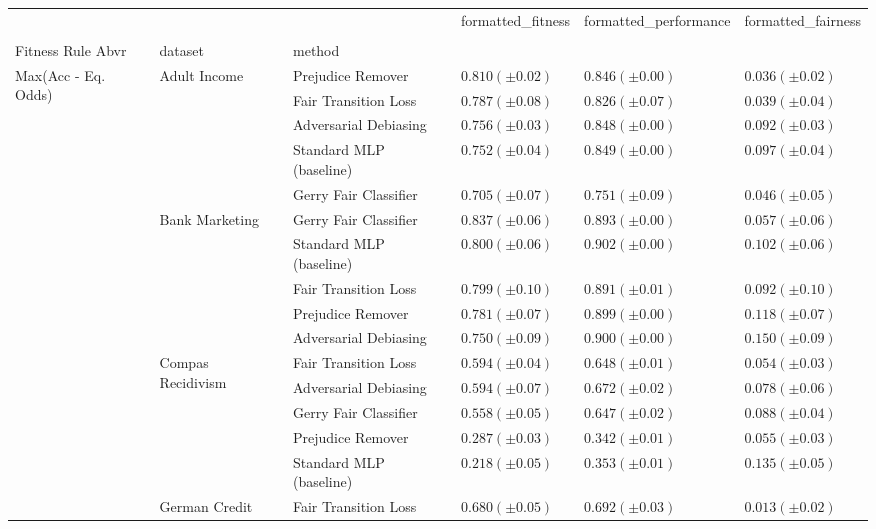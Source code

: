 \begin{tabular}{llllll}
\toprule
 &  &  & formatted_fitness & formatted_performance & formatted_fairness \\
 &  &  &  &  &  \\
Fitness Rule Abvr & dataset & method &  &  &  \\
\midrule
\multirow[t]{20}{*}{Max(Acc - Eq. Odds)} & \multirow[t]{5}{*}{Adult Income} & Prejudice Remover & $0.810 (\pm0.02)$ & $0.846 (\pm0.00)$ & $0.036 (\pm0.02)$ \\
 &  & Fair Transition Loss & $0.787 (\pm0.08)$ & $0.826 (\pm0.07)$ & $0.039 (\pm0.04)$ \\
 &  & Adversarial Debiasing & $0.756 (\pm0.03)$ & $0.848 (\pm0.00)$ & $0.092 (\pm0.03)$ \\
 &  & Standard MLP (baseline) & $0.752 (\pm0.04)$ & $0.849 (\pm0.00)$ & $0.097 (\pm0.04)$ \\
 &  & Gerry Fair Classifier & $0.705 (\pm0.07)$ & $0.751 (\pm0.09)$ & $0.046 (\pm0.05)$ \\
\cline{2-6}
 & \multirow[t]{5}{*}{Bank Marketing} & Gerry Fair Classifier & $0.837 (\pm0.06)$ & $0.893 (\pm0.00)$ & $0.057 (\pm0.06)$ \\
 &  & Standard MLP (baseline) & $0.800 (\pm0.06)$ & $0.902 (\pm0.00)$ & $0.102 (\pm0.06)$ \\
 &  & Fair Transition Loss & $0.799 (\pm0.10)$ & $0.891 (\pm0.01)$ & $0.092 (\pm0.10)$ \\
 &  & Prejudice Remover & $0.781 (\pm0.07)$ & $0.899 (\pm0.00)$ & $0.118 (\pm0.07)$ \\
 &  & Adversarial Debiasing & $0.750 (\pm0.09)$ & $0.900 (\pm0.00)$ & $0.150 (\pm0.09)$ \\
\cline{2-6}
 & \multirow[t]{5}{*}{Compas Recidivism} & Fair Transition Loss & $0.594 (\pm0.04)$ & $0.648 (\pm0.01)$ & $0.054 (\pm0.03)$ \\
 &  & Adversarial Debiasing & $0.594 (\pm0.07)$ & $0.672 (\pm0.02)$ & $0.078 (\pm0.06)$ \\
 &  & Gerry Fair Classifier & $0.558 (\pm0.05)$ & $0.647 (\pm0.02)$ & $0.088 (\pm0.04)$ \\
 &  & Prejudice Remover & $0.287 (\pm0.03)$ & $0.342 (\pm0.01)$ & $0.055 (\pm0.03)$ \\
 &  & Standard MLP (baseline) & $0.218 (\pm0.05)$ & $0.353 (\pm0.01)$ & $0.135 (\pm0.05)$ \\
\cline{2-6}
 & \multirow[t]{5}{*}{German Credit} & Fair Transition Loss & $0.680 (\pm0.05)$ & $0.692 (\pm0.03)$ & $0.013 (\pm0.02)$ \\

\end{tabular}

